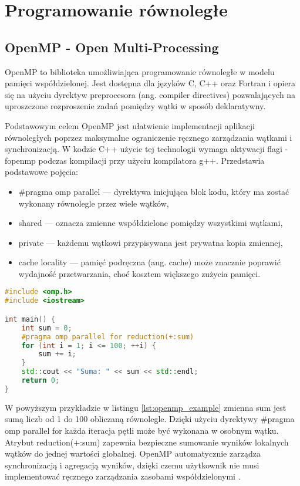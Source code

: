 \section{Programowanie równoległe}
\subsection{OpenMP -  Open Multi-Processing}
OpenMP to biblioteka umożliwiająca programowanie równoległe w modelu pamięci współdzielonej. Jest dostępna dla języków C, C++ oraz Fortran i opiera się na użyciu dyrektyw preprocesora (ang. compiler directives) pozwalających na uproszczone rozproszenie zadań pomiędzy wątki w sposób deklaratywny.

Podstawowym celem OpenMP jest ułatwienie implementacji aplikacji równoległych poprzez maksymalne ograniczenie ręcznego zarządzania wątkami i synchronizacją. W kodzie C++ użycie tej technologii wymaga aktywacji flagi -fopenmp podczas kompilacji przy użyciu kompilatora g++.
Przedstawia podstawowe pojęcia:
\begin{itemize}
    \item \#pragma omp parallel — dyrektywa inicjująca blok kodu, który ma zostać wykonany równolegle przez wiele wątków,
    \item shared — oznacza zmienne współdzielone pomiędzy wszystkimi wątkami,
    \item private — każdemu wątkowi przypisywana jest prywatna kopia zmiennej,
    \item cache locality — pamięć podręczna (ang. cache) może znacznie poprawić wydajność przetwarzania, choć kosztem większego zużycia pamięci.
\end{itemize}

\begin{lstlisting}[language=C++, caption={Przykład użycia OpenMP w C++}, label={lst:openmp_example}]
#include <omp.h>
#include <iostream>

int main() {
    int sum = 0;
    #pragma omp parallel for reduction(+:sum)
    for (int i = 1; i <= 100; ++i) {
        sum += i;
    }
    std::cout << "Suma: " << sum << std::endl;
    return 0;
}
\end{lstlisting}    
W powyższym przykładzie w listingu \ref{lst:openmp_example} zmienna sum jest sumą liczb od 1 do 100 obliczaną równolegle. Dzięki użyciu dyrektywy \#pragma omp parallel for każda iteracja pętli może być wykonana w osobnym wątku. Atrybut reduction(+:sum) zapewnia bezpieczne sumowanie wyników lokalnych wątków do jednej wartości globalnej. OpenMP automatycznie zarządza synchronizacją i agregacją wyników, dzięki czemu użytkownik nie musi implementować ręcznego zarządzania zasobami współdzielonymi
.

